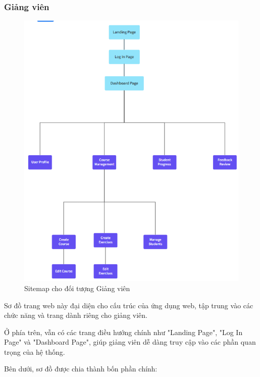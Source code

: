 \subsubsection{Giảng viên}
\begin{figure}[H]
    \centering
    \includegraphics[scale=0.7]{Images/sitemap/Instructor.png}
    \caption{Sitemap cho đối tượng Giảng viên}
    \label{fig:enter-label}
\end{figure}
\par Sơ đồ trang web này đại diện cho cấu trúc của ứng dụng web, tập trung vào các chức năng và trang dành riêng cho giảng viên.

\par Ở phía trên, vẫn có các trang điều hướng chính như "Landing Page", "Log In Page" và "Dashboard Page", giúp giảng viên dễ dàng truy cập vào các phần quan trọng của hệ thống.

\par Bên dưới, sơ đồ được chia thành bốn phần chính:

